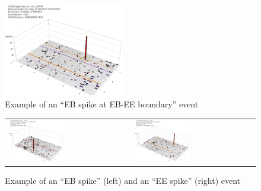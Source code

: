 %
\begin{figure}[h]
 \centering
   \includegraphics[width=0.47\textwidth]{fig/EBspikeAtBorder.eps} 
\caption{Example of an ``EB spike at EB-EE boundary'' event}
\label{fig:EBspikeAtBorder}
\end{figure}

%
\begin{figure}[h]
 \centering
 \begin{tabular}{ll}
   \includegraphics[width=0.47\textwidth]{fig/EBspike.eps} &
   \includegraphics[width=0.47\textwidth]{fig/EEspike.eps} \\
 \end{tabular}
\caption{Example of an ``EB spike'' (left) and an ``EE spike'' (right) event}
\label{fig:EBEEspike}
\end{figure}


